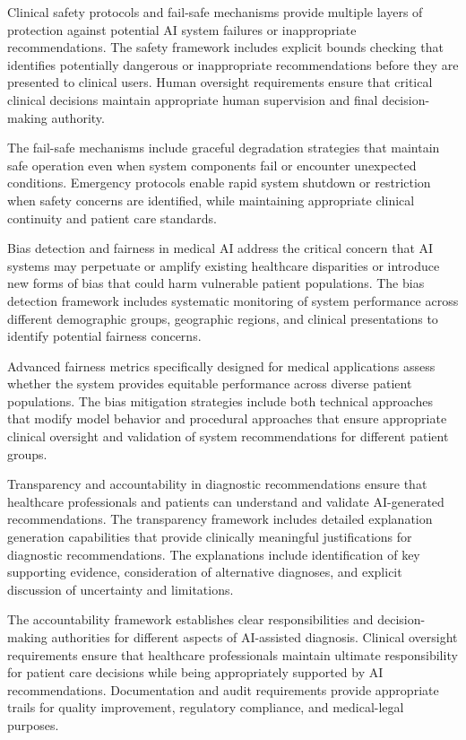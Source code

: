 Clinical safety protocols and fail-safe mechanisms provide multiple layers of protection against potential AI system failures or inappropriate recommendations. The safety framework includes explicit bounds checking that identifies potentially dangerous or inappropriate recommendations before they are presented to clinical users. Human oversight requirements ensure that critical clinical decisions maintain appropriate human supervision and final decision-making authority.

The fail-safe mechanisms include graceful degradation strategies that maintain safe operation even when system components fail or encounter unexpected conditions. Emergency protocols enable rapid system shutdown or restriction when safety concerns are identified, while maintaining appropriate clinical continuity and patient care standards.

Bias detection and fairness in medical AI address the critical concern that AI systems may perpetuate or amplify existing healthcare disparities or introduce new forms of bias that could harm vulnerable patient populations. The bias detection framework includes systematic monitoring of system performance across different demographic groups, geographic regions, and clinical presentations to identify potential fairness concerns.

Advanced fairness metrics specifically designed for medical applications assess whether the system provides equitable performance across diverse patient populations. The bias mitigation strategies include both technical approaches that modify model behavior and procedural approaches that ensure appropriate clinical oversight and validation of system recommendations for different patient groups.

Transparency and accountability in diagnostic recommendations ensure that healthcare professionals and patients can understand and validate AI-generated recommendations. The transparency framework includes detailed explanation generation capabilities that provide clinically meaningful justifications for diagnostic recommendations. The explanations include identification of key supporting evidence, consideration of alternative diagnoses, and explicit discussion of uncertainty and limitations.

The accountability framework establishes clear responsibilities and decision-making authorities for different aspects of AI-assisted diagnosis. Clinical oversight requirements ensure that healthcare professionals maintain ultimate responsibility for patient care decisions while being appropriately supported by AI recommendations. Documentation and audit requirements provide appropriate trails for quality improvement, regulatory compliance, and medical-legal purposes.

